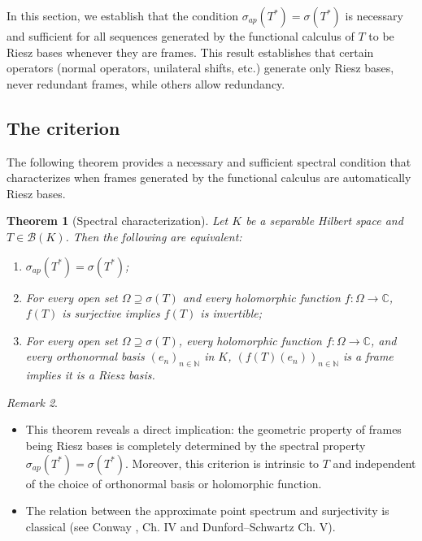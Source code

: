 \documentclass[a4paper,11pt]{article}
\theoremstyle{plain}
\newtheorem{theorem}{Theorem}[section]
\theoremstyle{definition}
\theoremstyle{remark}
\newtheorem{remark}[theorem]{Remark}
\begin{document}
In this section, we establish that the condition $\sigma_{ap}(T^*) = \sigma(T^*)$ is necessary and sufficient for all sequences generated by the functional calculus of $T$ to be Riesz bases whenever they are frames. This result establishes that certain operators (normal operators, unilateral shifts, etc.) generate only Riesz bases, never redundant frames, while others allow redundancy.

\subsection{The criterion}

The following theorem provides a necessary and sufficient spectral condition that characterizes when frames generated by the functional calculus are automatically Riesz bases.

\begin{theorem}[Spectral characterization]
\label{thm:spectral}
Let $K$ be a separable Hilbert space and $T \in \mathcal{B}(K)$. Then the following are equivalent:
\begin{enumerate}[label=(\roman*)]
\item $\sigma_{ap}(T^*) = \sigma(T^*)$;
\item For every open set $\Omega \supseteq \sigma(T)$ and every holomorphic function $f: \Omega \to \mathbb{C}$, $f(T)$ is surjective implies $f(T)$ is invertible;
\item For every open set $\Omega \supseteq \sigma(T)$, every holomorphic function $f: \Omega \to \mathbb{C}$, and every orthonormal basis $(e_n)_{n \in \mathbb{N}}$ in $K$, $(f(T)(e_n))_{n \in \mathbb{N}}$ is a frame implies it is a Riesz basis.
\end{enumerate}
\end{theorem}

\begin{remark}
\mbox{} \\
\begin{itemize}
\item This theorem reveals a direct implication: the geometric property of frames being Riesz bases is completely determined by the spectral property $\sigma_{ap}(T^*) = \sigma(T^*)$. Moreover, this criterion is intrinsic to $T$ and independent of the choice of orthonormal basis or holomorphic function.
\item The relation between the approximate point spectrum and surjectivity is classical (see Conway \cite{Conway1990}, Ch. IV and Dunford–Schwartz \cite{DunfordSchwartz1958} Ch. V).
\end{itemize}
\end{remark}
\end{document}
